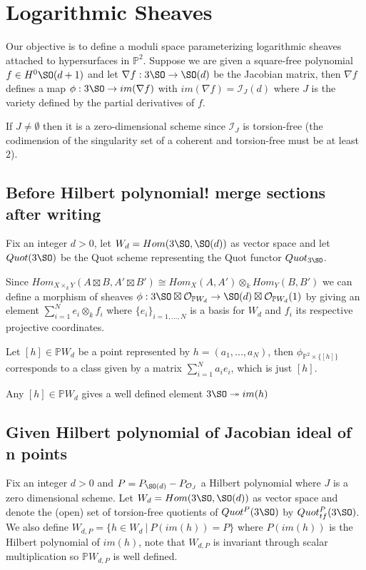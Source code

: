 \section{Logarithmic Sheaves}
Our objective is to define a moduli space parameterizing logarithmic sheaves attached to hypersurfaces in $\mathbb{P}^2$. Suppose we are given a square-free polynomial $f \in H^0 \SO(d+1)$ and let $\nabla f: 3\SO \to \SO(d)$ be the Jacobian matrix, then $\nabla f$ defines a map $\phi:3\SO \to im(\nabla f)$ with $im(\nabla f) = \mathcal{I}_J(d)$ where $J$ is the variety defined by the partial derivatives of $f$.

\begin{remark}
If $J \not= \emptyset$ then it is a zero-dimensional scheme since $\mathcal{I}_J$ is torsion-free (the codimension of the singularity set of a coherent and torsion-free must be at least $2$).
\end{remark}


\subsection{Before Hilbert polynomial! merge sections after writing}
Fix an integer $d>0$, let $W_d = Hom(3\SO,\SO(d))$ as vector space and let $Quot(3\SO)$ be the Quot scheme representing the Quot functor $Quot_{3\SO}$.

Since $Hom_{X \times_k Y}(A \boxtimes B , A' \boxtimes B') \cong Hom_X(A,A') \otimes_k Hom_Y(B,B')$ we can define a morphism of sheaves $\phi:3\SO \boxtimes \mathcal{O}_{\mathbb{P}W_d} \to \SO(d) \boxtimes \mathcal{O}_{\mathbb{P}W_d}(1)$ by giving an element $\sum_{i=1}^N e_i \otimes_k f_i$ where $\{e_i\}_{i=1,...,N}$ is a basis for $W_d$ and $f_i$ its respective projective coordinates.

\begin{remark}
Let $[h] \in \mathbb{P}W_d$ be a point represented by $h = (a_1,...,a_N)$, then $\phi_{\mathbb{P}^2 \times \{[h]\} }$ corresponds to a class given by a matrix $\sum_{i=1}^N a_i e_i$, which is just $[h]$.
\end{remark}

Any $[h] \in \mathbb{P}W_d$ gives a well defined element $3\SO \twoheadrightarrow im(h)$


\subsection{Given Hilbert polynomial of Jacobian ideal of n points}
Fix an integer $d > 0$ and $P = P_{\SO(d)}-P_{\mathcal{O}_J}$ a Hilbert polynomial where $J$ is a zero dimensional scheme. Let $W_d = Hom(3\SO,\SO(d))$ as vector space and denote the (open) set of torsion-free quotients of $Quot^P(3\SO)$ by $Quot_{tf}^P(3 \SO)$.
We also define $W_{d,P} = \{h \in W_d \ | \ P(im(h)) = P \}$ where $P(im(h))$ is the Hilbert polynomial of $im(h)$, note that $W_{d,P}$ is invariant through scalar multiplication so $\mathbb{P}W_{d,P}$ is well defined.

